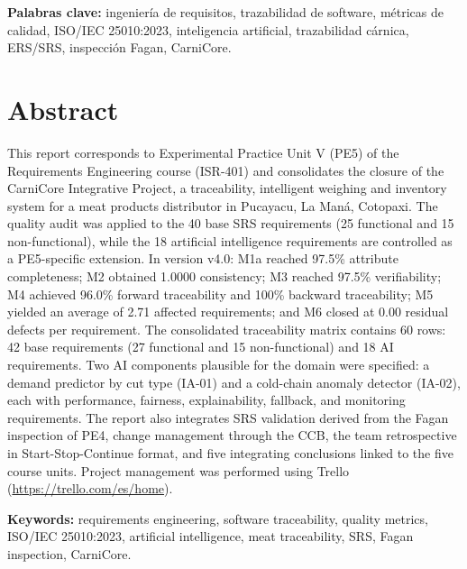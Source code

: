 \documentclass[11pt,a4paper]{article}
\begin{document}
\textbf{Palabras clave:} ingeniería de requisitos, trazabilidad de software, métricas de calidad, ISO/IEC 25010:2023, inteligencia artificial, trazabilidad cárnica, ERS/SRS, inspección Fagan, CarniCore.

\vspace{1cm}

\section*{Abstract}

This report corresponds to Experimental Practice Unit V (PE5) of the Requirements Engineering course (ISR-401) and consolidates the closure of the CarniCore Integrative Project, a traceability, intelligent weighing and inventory system for a meat products distributor in Pucayacu, La Maná, Cotopaxi. The quality audit was applied to the 40 base SRS requirements (25 functional and 15 non-functional), while the 18 artificial intelligence requirements are controlled as a PE5-specific extension. In version v4.0: M1a reached 97.5\% attribute completeness; M2 obtained 1.0000 consistency; M3 reached 97.5\% verifiability; M4 achieved 96.0\% forward traceability and 100\% backward traceability; M5 yielded an average of 2.71 affected requirements; and M6 closed at 0.00 residual defects per requirement. The consolidated traceability matrix contains 60 rows: 42 base requirements (27 functional and 15 non-functional) and 18 AI requirements. Two AI components plausible for the domain were specified: a demand predictor by cut type (IA-01) and a cold-chain anomaly detector (IA-02), each with performance, fairness, explainability, fallback, and monitoring requirements. The report also integrates SRS validation derived from the Fagan inspection of PE4, change management through the CCB, the team retrospective in Start-Stop-Continue format, and five integrating conclusions linked to the five course units. Project management was performed using Trello (\url{https://trello.com/es/home}).

\textbf{Keywords:} requirements engineering, software traceability, quality metrics, ISO/IEC 25010:2023, artificial intelligence, meat traceability, SRS, Fagan inspection, CarniCore.

\newpage
\tableofcontents
\newpage
\listoftables
\newpage
\listoffigures
\newpage

\end{document}
